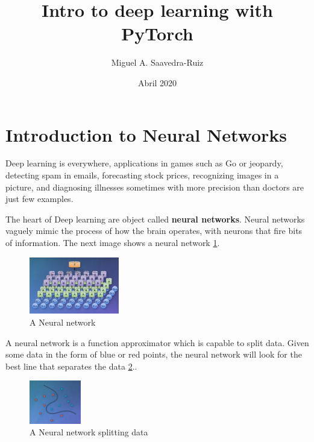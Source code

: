 \documentclass{article}
\title{Intro to deep learning with PyTorch}
\author{Miguel A. Saavedra-Ruiz}
\date{Abril 2020}
\begin{document}
\maketitle

\section{Introduction to Neural Networks}

Deep learning is everywhere, applications in games such as Go or jeopardy, detecting spam in emails, forecasting stock prices, recognizing images in a picture, and diagnosing illnesses sometimes with more precision than doctors are just few examples.

The heart of Deep learning are object called \textbf{neural networks}. Neural networks vaguely mimic the process of how the brain operates, with neurons that fire bits of information. The next image shows a neural network \ref{fig:f1}.

\begin{figure}[ht]
    \centering
    \includegraphics[width=0.35\textwidth,height=0.35\textheight,keepaspectratio]{images/nn.PNG}
    \captionsetup{justification=centering}
    \caption{A Neural network}
    \label{fig:f1}
\end{figure}

A neural network is a function approximator which is capable to split data. Given some data in the form of blue or red points, the neural network will look for the best line that separates the data \ref{fig:f2}..

\begin{figure}[ht]
    \centering
    \includegraphics[width=0.2\textwidth,height=0.2\textheight,keepaspectratio]{images/data.PNG}
    \captionsetup{justification=centering}
    \caption{A Neural network splitting data}
    \label{fig:f2}
\end{figure}
\end{document}
